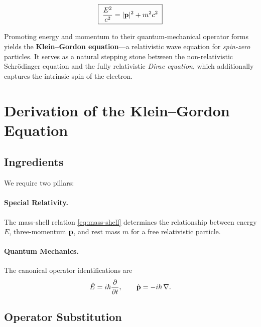 \documentclass[12pt, a4paper]{article}
\theoremstyle{definition}
\begin{document}
\begin{equation}\label{eq:mass-shell}
    \boxed{\;
    \frac{E^{2}}{c^{2}} = |\vb{p}|^{2} + m^{2}c^{2}
    \;}
\end{equation}

Promoting energy and momentum to their quantum-mechanical operator forms yields
the \textbf{Klein--Gordon equation}---a relativistic wave equation for
\emph{spin-zero} particles.  It serves as a natural stepping stone between the
non-relativistic Schr\"{o}dinger equation and the fully relativistic
\emph{Dirac equation}, which additionally captures the intrinsic spin of the
electron.

\section{Derivation of the Klein--Gordon Equation}
\label{sec:derivation}

\subsection{Ingredients}

We require two pillars:

\paragraph{Special Relativity.}
The mass-shell relation \eqref{eq:mass-shell} determines the relationship
between energy $E$, three-momentum $\vb{p}$, and rest mass $m$ for a free
relativistic particle.

\paragraph{Quantum Mechanics.}
The canonical operator identifications are
\begin{equation}\label{eq:operators}
    \hat{E} = i\hbar\frac{\partial}{\partial t},
    \qquad
    \hat{\vb{p}} = -i\hbar\,\nabla.
\end{equation}

\subsection{Operator Substitution}
\end{document}
